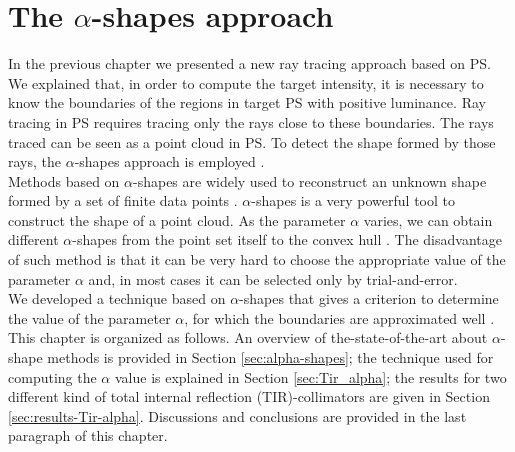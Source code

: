 \chapter{The $\alpha$-shapes approach}\label{chap:boundaries_alpha}
In the previous chapter we presented a new ray tracing approach based on PS. We explained that, in order to compute the target intensity, it is necessary to know the boundaries of the regions in target PS with positive luminance. Ray tracing in PS requires tracing only the rays close to these boundaries. The rays traced can be seen as a point cloud in PS. To detect the shape formed by those rays, the $\alpha$-shapes approach is employed \cite{portegies2013fast}.\\ \indent
Methods based on $\alpha$-shapes are widely used to reconstruct an unknown shape formed by a set of finite data points \cite{guo1997surface}. $\alpha$-shapes is a very powerful tool to construct the shape of a point cloud. As the parameter $\alpha$ varies, we can obtain different $\alpha$-shapes from the point set itself to the convex
hull \cite{xu2003automatic}. The disadvantage of such method is that it can be very hard to choose the appropriate value of the parameter $\alpha$ and, in most cases it can be selected only by trial-and-error.\\ \indent
We developed a technique based on $\alpha$-shapes that gives a criterion to determine the value of the parameter $\alpha$, for which the boundaries are approximated well \cite{filosa2015new}.\\ \indent This chapter is organized as follows. An overview of the-state-of-the-art about $\alpha$-shape methods is provided in Section \ref{sec:alpha-shapes}; the technique used for computing the $\alpha$ value is explained in Section \ref{sec:Tir_alpha}; the results for two different kind of total internal reflection (TIR)-collimators are given in Section \ref{sec:results-Tir-alpha}. Discussions and conclusions are provided in the last paragraph of this chapter.

